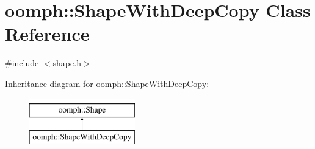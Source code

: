 \hypertarget{classoomph_1_1ShapeWithDeepCopy}{}\section{oomph\+:\+:Shape\+With\+Deep\+Copy Class Reference}
\label{classoomph_1_1ShapeWithDeepCopy}


{\ttfamily \#include $<$shape.\+h$>$}

Inheritance diagram for oomph\+:\+:Shape\+With\+Deep\+Copy\+:\begin{figure}[H]
\begin{center}
\leavevmode
\includegraphics[height=2.000000cm]{classoomph_1_1ShapeWithDeepCopy}
\end{center}
\end{figure}
